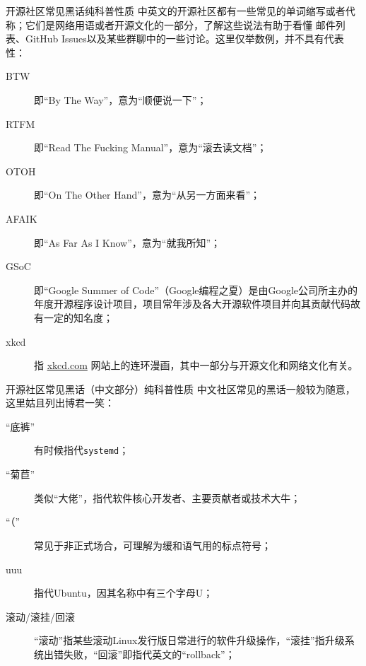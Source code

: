 \begin{frame}{开源社区常见黑话}{纯科普性质}
	中英文的开源社区都有一些常见的单词缩写或者代称；它们是网络用语或者开源文化的一部分，了解这些说法有助于看懂
	邮件列表、GitHub Issues以及某些群聊中的一些讨论。这里仅举数例，并不具有代表性：
	\vfill
	\begin{description}
		\item[BTW] 即“By The Way”，意为“顺便说一下”；
		\item[RTFM] 即“Read The Fucking Manual”，意为“滚去读文档”；
		\item[OTOH] 即“On The Other Hand”，意为“从另一方面来看”；
		\item[AFAIK] 即“As Far As I Know”，意为“就我所知”；
		\item[GSoC] 即“Google Summer of Code”（Google编程之夏）是由Google公司所主办的年度开源程序设计项目，项目常年涉及各大开源软件项目并向其贡献代码故有一定的知名度；
		\item[xkcd] 指 \href{https://xkcd.com}{xkcd.com} 网站上的连环漫画，其中一部分与开源文化和网络文化有关。
				
	\end{description}
\end{frame}

\begin{frame}{开源社区常见黑话（中文部分）}{纯科普性质}
	中文社区常见的黑话一般较为随意，这里姑且列出博君一笑：
	\vfill
	\begin{description}
		\item[“底裤”] 有时候指代\texttt{systemd}；
		\item[“菊苣”] 类似“大佬”，指代软件核心开发者、主要贡献者或技术大牛；
		\item[“（”] 常见于非正式场合，可理解为缓和语气用的标点符号；
		\item[uuu] 指代Ubuntu，因其名称中有三个字母U；
		\item[滚动/滚挂/回滚] “滚动”指某些滚动Linux发行版日常进行的软件升级操作，“滚挂”指升级系统出错失败，“回滚”即指代英文的“rollback”；
		
	\end{description}
\end{frame}